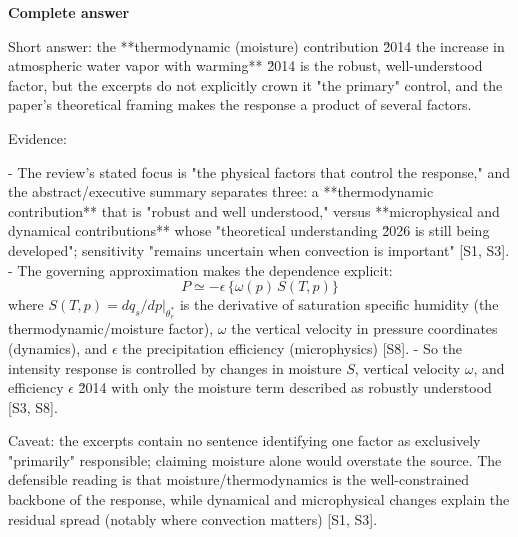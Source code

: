 \documentclass[10pt]{article}
\begin{document}
\textbf{Complete answer}
\begin{AnswerText}
Short answer: the **thermodynamic (moisture) contribution \u2014 the increase in atmospheric water vapor with warming** \u2014 is the robust, well-understood factor, but the excerpts do not explicitly crown it "the primary" control, and the paper's theoretical framing makes the response a product of several factors.

Evidence:

- The review's stated focus is "the physical factors that control the response," and the abstract/executive summary separates three: a **thermodynamic contribution** that is "robust and well understood," versus **microphysical and dynamical contributions** whose "theoretical understanding \u2026 is still being developed"; sensitivity "remains uncertain when convection is important" [S1, S3].
- The governing approximation makes the dependence explicit:  
  $$P \simeq -\epsilon\,\{\omega(p)\,S(T,p)\}$$  
  where $S(T,p)=dq_s/dp|_{\theta_e^*}$ is the derivative of saturation specific humidity (the thermodynamic/moisture factor), $\omega$ the vertical velocity in pressure coordinates (dynamics), and $\epsilon$ the precipitation efficiency (microphysics) [S8].
- So the intensity response is controlled by changes in moisture $S$, vertical velocity $\omega$, and efficiency $\epsilon$ \u2014 with only the moisture term described as robustly understood [S3, S8].

Caveat: the excerpts contain no sentence identifying one factor as exclusively "primarily" responsible; claiming moisture alone would overstate the source. The defensible reading is that moisture/thermodynamics is the well-constrained backbone of the response, while dynamical and microphysical changes explain the residual spread (notably where convection matters) [S1, S3].
\end{AnswerText}
\end{document}
